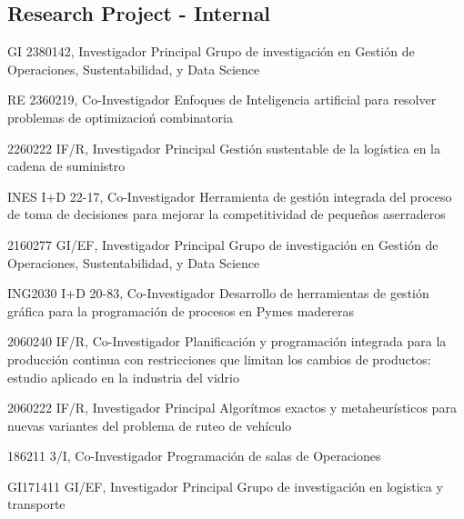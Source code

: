 \subsection{Research Project - Internal}

{GI 2380142, Investigador Principal}
{Grupo de investigaci\'on en Gesti\'on de Operaciones, Sustentabilidad, y Data Science}

{RE 2360219, Co-Investigador}
{Enfoques de Inteligencia artificial para resolver problemas de optimizacio\'n combinatoria}

{2260222 IF/R, Investigador Principal}
{Gesti\'on sustentable de la log\'istica en la cadena de suministro}

{INES I+D 22-17, Co-Investigador}
{Herramienta de gesti\'on integrada del proceso de toma de decisiones para mejorar la competitividad de peque\~nos aserraderos}

{2160277 GI/EF, Investigador Principal}
{Grupo de investigaci\'on en Gesti\'on de Operaciones, Sustentabilidad, y Data Science}

{ING2030 I+D 20-83, Co-Investigador}
{Desarrollo de herramientas de gesti\'on gr\'afica para la programaci\'on de procesos en Pymes madereras}

{2060240 IF/R, Co-Investigador}
{Planificaci\'on y programaci\'on integrada para la producci\'on continua con restricciones que limitan los cambios de productos: estudio aplicado en la industria del vidrio}

{2060222 IF/R, Investigador Principal}
{Algor\'itmos exactos y metaheur\'isticos para nuevas variantes del problema de ruteo de veh\'iculo}

{186211 3/I, Co-Investigador}
{Programaci\'on de salas de Operaciones}

{GI171411 GI/EF, Investigador Principal}
{Grupo de investigaci\'on en logistica y transporte}

\clearpage